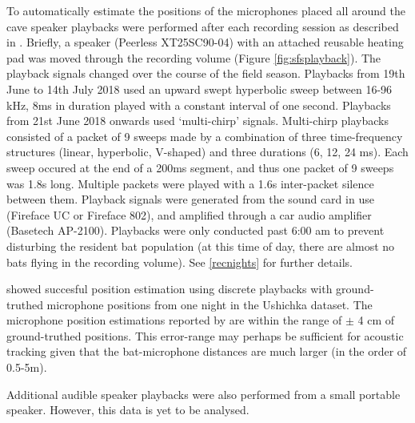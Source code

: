 \documentclass[
]{book}
\begin{document}
To automatically estimate the positions of the microphones placed all around the cave speaker playbacks were performed after each recording session as described in \citet{sfs_cotdoa}. Briefly, a speaker (Peerless XT25SC90-04) with an attached reusable heating pad was moved through the recording volume (Figure \ref{fig:sfsplayback}). The playback signals changed over the course of the field season. Playbacks from 19th June to 14th July 2018 used an upward swept hyperbolic sweep between 16-96 kHz, 8ms in duration played with a constant interval of one second. Playbacks from 21st June 2018 onwards used `multi-chirp' signals. Multi-chirp playbacks consisted of a packet of 9 sweeps made by a combination of three time-frequency structures (linear, hyperbolic, V-shaped) and three durations (6, 12, 24 ms). Each sweep occured at the end of a 200ms segment, and thus one packet of 9 sweeps was 1.8s long. Multiple packets were played with a 1.6s inter-packet silence between them. Playback signals were generated from the sound card in use (Fireface UC or Fireface 802), and amplified through a car audio amplifier (Basetech AP-2100). Playbacks were only conducted past 6:00 am to prevent disturbing the resident bat population (at this time of day, there are almost no bats flying in the recording volume). See \ref{recnights} for further details.

\citet{sfs_cotdoa} showed succesful position estimation using discrete playbacks with ground-truthed microphone positions from one night in the Ushichka dataset. The microphone position estimations reported by \citet{sfs_cotdoa} are within the range of \(\pm\) 4 cm of ground-truthed positions. This error-range may perhaps be sufficient for acoustic tracking given that the bat-microphone distances are much larger (in the order of 0.5-5m).

Additional audible speaker playbacks were also performed from a small portable speaker. However, this data is yet to be analysed.
\end{document}
